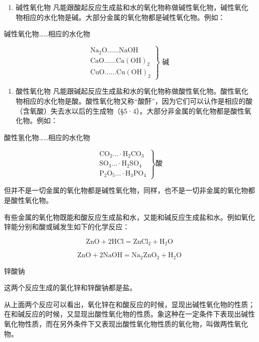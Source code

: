 \begin{enumerate}
\item
  碱性氧化物
  凡能跟酸起反应生成盐和水的氧化物称做碱性氧化物，碱性氧化物相应的水化物是碱。大部分金属的氧化物都是碱性氧化物。例如：
\end{enumerate}

碱性氧化物\ldots\ldots 相应的水化物

\[
\left. \begin{array}{c} \mathrm{Na}_{2} \mathrm{O} \dots \dots \mathrm{NaOH} \\ \mathrm{CaO} \dots \dots \mathrm{Ca(OH)}_{2} \\ \mathrm{CuO} \dots \dots \mathrm{Cu(OH)}_{2} \end{array} \right\} \text{ 碱 }
\]

\begin{enumerate}[start=2]
\item
  酸性氧化物
  凡能跟碱起反应生成盐和水的氧化物称做酸性氧化物。酸性氧化物相应的水化物是酸。酸性氧化物又称``酸酐''，因为它们可以认作是相应的酸（含氧酸）失去水以后的生成物（§5·4）。大部分非金属的氧化物都是酸性氧化物。例如：
\end{enumerate}

酸性氢化物\ldots\ldots 相应的水化物

\[
\left. \begin{array}{l} \mathrm{CO}_{2} \dots \cdot \mathrm{H}_{2} \mathrm{CO}_{3} \\ \mathrm{SO}_{3} \dots \cdot \mathrm{H}_{2} \mathrm{SO}_{4} \\ \mathrm{P}_{2} \mathrm{O}_{5} \dots \cdot \mathrm{H}_{3} \mathrm{PO}_{4} \end{array} \right\} \text{酸}
\]

但并不是一切金属的氧化物都是碱性氧化物，同样，也不是一切非金属的氧化物都是酸性氧化物。

有些金属的氧化物既能和酸反应生成盐和水，又能和碱反应生成盐和水。例如氧化锌能分别和酸或碱发生如下的化学反应：

\[
\mathrm{ZnO} + 2 \mathrm{HCl} = \mathrm{ZnCl}_{2} + \mathrm{H}_{2} \mathrm{O}
\]

\[
\mathrm{ZnO} + 2 \mathrm{NaOH} = \mathrm{Na}_{2} \mathrm{ZnO}_{2} + \mathrm{H}_{2} \mathrm{O}
\]

锌酸钠

这两个反应生成的氯化锌和锌酸钠都是盐。

从上面两个反应可以看出，氧化锌在和酸反应的时候，显现出碱性氧化物的性质；在和碱反应的时候，又显现出酸性氧化物的性质。象这种在一定条件下表现出碱性氧化物性质，而在另外条件下又表现出酸性氧化物性质的氧化物，叫做两性氧化物。

